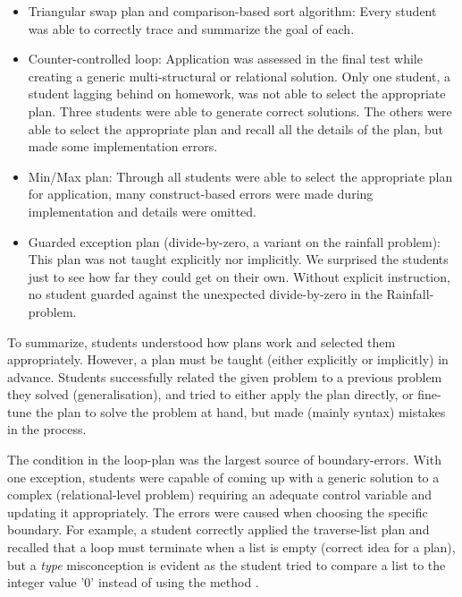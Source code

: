 \begin{itemize}[leftmargin=1em]
\item Triangular swap plan and comparison-based sort algorithm: Every
    student was able to correctly trace and summarize the goal of each.


\item Counter-controlled loop: Application was assessed in the final test
    while creating a generic multi-structural or relational solution. Only
    one student, a student lagging behind on homework, was not able to
    select the appropriate plan. Three students were able to generate
    correct solutions. The others were able to select the appropriate plan
    and recall all the details of the plan, but made some implementation
    errors.

\item Min/Max plan: Through all students were able to select the
    appropriate plan for application, many construct-based errors were made
    during implementation and details were omitted.

\item Guarded exception plan (divide-by-zero, a variant on the rainfall
    problem): This plan was not taught explicitly nor implicitly. We
        surprised the students just to see how far they could get on their
        own. Without explicit instruction, no student guarded against the
        unexpected divide-by-zero in the Rainfall-problem.


\end{itemize}


To summarize, students understood how plans work and selected them
appropriately. However, a plan must be taught (either explicitly or
    implicitly) in advance. Students
successfully related the given problem to a previous problem they solved
(generalisation), and tried to either apply the plan directly, or fine-tune
the plan to solve the problem at hand, but made (mainly syntax) mistakes in
the process.

The condition in the loop-plan was the largest source of boundary-errors.
With one exception, students were capable of coming up with a generic
solution to a complex (relational-level problem) requiring an adequate
control variable and updating it appropriately. The errors were caused when
choosing the specific boundary. For example, a student correctly applied the
traverse-list plan and recalled that a  loop must terminate when a
list is empty (correct idea for a plan), but a \emph{type} misconception is
evident as the student tried to compare a list to the integer value '0'
instead of using the method .

